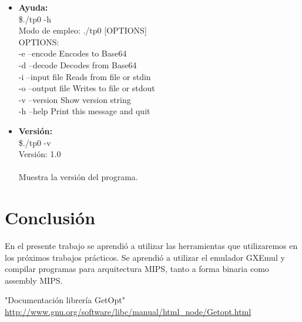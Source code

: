 \documentclass[a4paper,10pt, fleqn]{article}
\begin{document}
\begin{itemize}
\begin{verbatim}
      \end{verbatim}

      

      \item \textbf{Ayuda: } \\
      \$./tp0 -h\\
Modo de empleo: ./tp0 [OPTIONS]\\
OPTIONS:\\
-e --encode Encodes to Base64\\
-d --decode Decodes from Base64\\
-i --input file Reads from file or stdin\\
-o --output file Writes to file or stdout\\
-v --version Show version string\\
-h --help Print this message and quit\\

      \item \textbf{Versión: } \\
      \$./tp0 -v  \\
      Versión: 1.0 \\\\
      Muestra la versión del programa. \\


      \end{itemize}

\section{Conclusión}
     En el presente trabajo se aprendió a utilizar las herramientas que utilizaremos en los próximos trabajos prácticos. 
     Se aprendió a utilizar el emulador GXEmul y compilar programas para arquitectura MIPS, tanto a forma binaria como assembly MIPS.



 \begin{thebibliography}{99}

  "Documentación librería GetOpt" \url{http://www.gnu.org/software/libc/manual/html_node/Getopt.html}
 \end{thebibliography}
\end{document}
